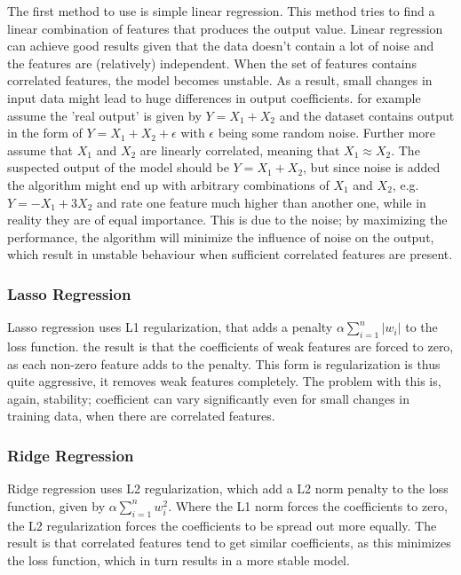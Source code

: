\npar

The first method to use is simple linear regression. This method tries to find a linear combination of features that produces the output value. Linear regression can achieve good results given that the data doesn't contain a lot of noise and the features are (relatively) independent. When the set of features contains correlated features, the model becomes unstable. As a result, small changes in input data might lead to huge differences in output coefficients. for example assume the 'real output' is given by $Y = X_1 + X_2$ and the dataset contains output in the form of $Y = X_1 + X_2 + \epsilon$ with $\epsilon$ being some random noise. Further more assume that $X_1$ and $X_2$ are linearly correlated, meaning that $X_1 \approx X_2$. The suspected output of the model should be $Y = X_1 + X_2$, but since noise is added the algorithm might end up with arbitrary combinations of $X_1$ and $X_2$, e.g. $Y = -X_1 + 3X_2$ and rate one feature much higher than another one, while in reality they are of equal importance. This is due to the noise; by maximizing the performance, the algorithm will minimize the influence of noise on the output, which result in unstable behaviour when sufficient correlated features are present. 

\subsubsection{Lasso Regression}
Lasso regression uses L1 regularization, that adds a penalty $\alpha\sum\limits_{i=1}^{n} |w_i|$ to the loss function. the result is that the coefficients of weak features are forced to zero, as each non-zero feature adds to the penalty. This form is regularization is thus quite aggressive, it removes weak features completely. The problem with this is, again, stability; coefficient can vary significantly even for small changes in training data, when there are correlated features.

\subsubsection{Ridge Regression}
Ridge regression uses L2 regularization, which add a L2 norm penalty to the loss function, given by $\alpha\sum\limits_{i=1}^{n} w_i^2$. Where the L1 norm forces the coefficients to zero, the L2 regularization forces the coefficients to be spread out more equally. The result is that correlated features tend to get similar coefficients, as this minimizes the loss function, which in turn results in a more stable model. 

